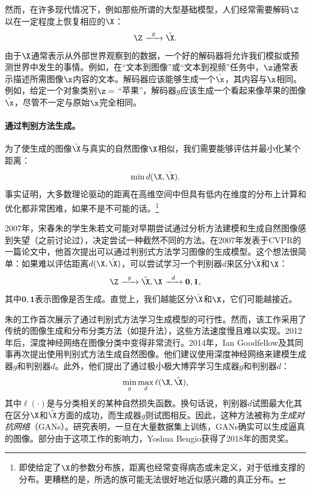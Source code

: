 \documentclass[../../book-main.tex]{subfiles}
\begin{document}
然而，在许多现代情况下，例如那些所谓的大型基础模型，人们经常需要解码$\Z$以在一定程度上恢复相应的$\X$：
\begin{equation}
    \Z   \xrightarrow{\hspace{2mm} g  \hspace{2mm}} \hat \X.
       \label{eqn:decoding-deep-networks}
\end{equation}
由于$\X$通常表示从外部世界观察到的数据，一个好的解码器将允许我们模拟或预测世界中发生的事情。例如，在“文本到图像”或“文本到视频”任务中，$\z$通常表示描述所需图像$\x$内容的文本。解码器应该能够生成一个$\hat \x$，其内容与$\x$相同。例如，给定一个对象类别$\z = $ ``苹果''，解码器$g$应该生成一个看起来像苹果的图像$\hat \x$，尽管不一定与原始$\x$完全相同。

\paragraph{通过判别方法生成。}
为了使生成的图像$\hat \X$与真实的自然图像$\X$相似，我们需要能够评估并最小化某个距离：
\begin{equation}
    \min d(\X, \hat \X).
\end{equation}
事实证明，大多数理论驱动的距离在高维空间中但具有低内在维度的分布上计算和优化都非常困难，如果不是不可能的话。\footnote{即使给定了$\X$的参数分布族，距离也经常变得病态或未定义，对于低维支撑的分布。更糟糕的是，所选的族可能无法很好地近似感兴趣的真正分布。}

2007年，宋春朱的学生朱若文可能对早期尝试通过分析方法建模和生成自然图像感到失望（之前讨论过），决定尝试一种截然不同的方法。在2007年发表于CVPR的一篇论文中\cite{Tu-2007}，他首次提出可以通过判别式方法学习图像的生成模型。这个想法很简单：如果难以评估距离$d(\X, \hat \X)$，可以尝试学习一个判别器$d$来区分$\hat \X$和$\X$：
\begin{equation}
    \Z   \xrightarrow{\hspace{2mm} g  \hspace{2mm}} \hat \X, \X \xrightarrow{\hspace{2mm} d  \hspace{2mm}} \boldsymbol{0}, \boldsymbol{1},
       \label{eqn:gan-networks}
\end{equation}
其中$\boldsymbol{0}, \boldsymbol{1}$表示图像是否生成。直觉上，我们越能区分$\hat \X$和$\X$，它们可能越接近。

朱的工作\cite{Tu-2007}首次展示了通过判别式方法学习生成模型的可行性。然而，该工作采用了传统的图像生成和分布分类方法（如提升法），这些方法速度慢且难以实现。2012年后，深度神经网络在图像分类中变得非常流行。2014年，Ian Goodfellow及其同事再次提出使用判别式方法生成自然图像\cite{Goodfellow-2014}。他们建议使用深度神经网络来建模生成器$g$和判别器$d$。此外，他们提出了通过极小极大博弈学习生成器$g$和判别器$d$：
\begin{equation}
    \min_g \max_d \ell(\X, \hat \X),
\end{equation}
其中$\ell(\cdot)$是与分类相关的某种自然损失函数。换句话说，判别器$d$试图最大化其在区分$\X$和$\hat \X$方面的成功，而生成器$g$则试图相反。因此，这种方法被称为{\em 生成对抗网络}（GANs）。研究表明，一旦在大量数据集上训练，GANs确实可以生成逼真的图像。部分由于这项工作的影响力，Yoshua Bengio获得了2018年的图灵奖。
\end{document}

